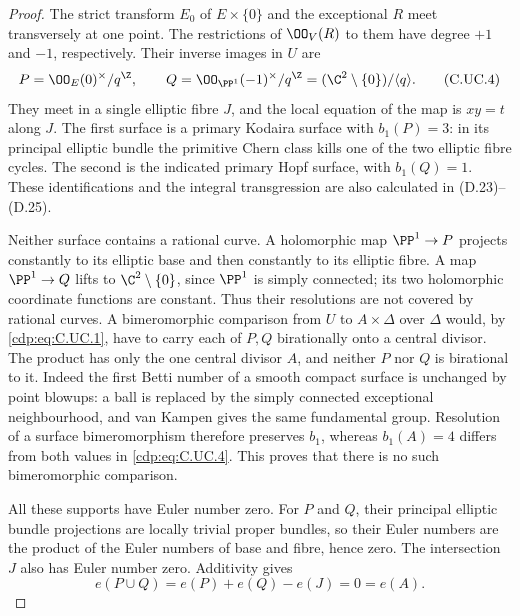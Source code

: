 \begin{proof}
The strict transform $E_0$ of $E\times\{0\}$
and the exceptional $R$ meet transversely at
one point. The restrictions of $\OO_V(R)$
to them have degree $+1$ and $-1$,
respectively. Their inverse images in $U$
are
\[
 P=\OO_E(0)^\times/q^{\Z},\qquad
 Q=\OO_{\PP^1}(-1)^\times/q^{\Z}
       =(\C^2\setminus\{0\})/\langle q\rangle.
\tag{C.UC.4}\label{cdp:eq:C.UC.4}
\]
They meet in a single elliptic fibre $J$,
and the local equation of the map is
$xy=t$ along $J$. The first surface is a
primary Kodaira surface with $b_1(P)=3$:
in its principal elliptic bundle the primitive
Chern class kills one of the two elliptic
fibre cycles. The second is the indicated
primary Hopf surface, with $b_1(Q)=1$.
These identifications and the integral
transgression are also calculated in
(D.23)--(D.25).

Neither surface contains a rational curve.
A holomorphic map $\PP^1\to P$ projects
constantly to its elliptic base and then
constantly to its elliptic fibre. A map
$\PP^1\to Q$ lifts to $\C^2\setminus\{0\}$,
since $\PP^1$ is simply connected; its two
holomorphic coordinate functions are constant.
Thus their resolutions are not covered by
rational curves. A bimeromorphic comparison
from $U$ to $A\times\Delta$ over $\Delta$
would, by \eqref{cdp:eq:C.UC.1}, have to carry each of
$P,Q$ birationally onto a central divisor.
The product has only the one central
divisor $A$, and neither $P$ nor $Q$ is
birational to it. Indeed the first Betti
number of a smooth compact surface is
unchanged by point blowups: a ball is
replaced by the simply connected exceptional
neighbourhood, and van Kampen gives the
same fundamental group. Resolution of a
surface bimeromorphism therefore preserves
$b_1$, whereas $b_1(A)=4$ differs from
both values in \eqref{cdp:eq:C.UC.4}. This proves that
there is no such bimeromorphic comparison.

All these supports have Euler number zero.
For $P$ and $Q$, their principal elliptic
bundle projections are locally trivial
proper bundles, so their Euler numbers are
the product of the Euler numbers of base
and fibre, hence zero. The intersection
$J$ also has Euler number zero. Additivity
gives
\[
                    e(P\cup Q)=e(P)+e(Q)-e(J)=0=e(A).
\tag{C.UC.5}\label{cdp:eq:C.UC.5}
\]


\end{proof}
